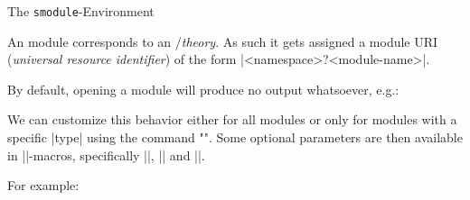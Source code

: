 \begin{sfragment}{The \texttt{smodule}-Environment}
    \begin{mmtbox}
        An \sTeX module corresponds to an \mmt/\omdoc \emph{theory}.
        As such it gets assigned a module URI (\emph{universal resource identifier})
        of the form |<namespace>?<module-name>|.
    \end{mmtbox}

    By default, opening a module will produce no output whatsoever,
    e.g.:

    \begin{function}{\stexpatchmodule}
        We can customize this behavior either for all modules or
        only for modules with a specific |type| using the command
        \stexcode"".
        Some optional parameters are then available in |\smodule*|-macros,
        specifically |\smoduletitle|, |\smoduletype| and |\smoduleid|.
    \end{function}
        For example:


\end{sfragment}